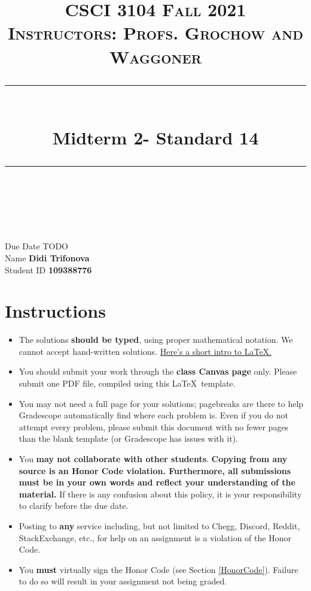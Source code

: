 \documentclass[11pt]{article}
\title{
\normalfont \normalsize 
\textsc{CSCI 3104 Fall 2021 \\ 
Instructors: Profs. Grochow and Waggoner} \\
[10pt] 
\rule{\linewidth}{0.5pt} \\[6pt] 
\huge Midterm 2- Standard 14 \\
\rule{\linewidth}{2pt}  \\[10pt]
}
\date{}
\theoremstyle{definition}
\theoremstyle{definition}
\theoremstyle{definition}
\begin{document}

\maketitle


\noindent
Due Date \dotfill TODO \\
Name \dotfill \textbf{Didi Trifonova} \\
Student ID \dotfill \textbf{109388776} \\


\tableofcontents

\section{Instructions}
 \begin{itemize}
	\item The solutions \textbf{should be typed}, using proper mathematical notation. We cannot accept hand-written solutions. \href{http://ece.uprm.edu/~caceros/latex/introduction.pdf}{Here's a short intro to \LaTeX.}
	\item You should submit your work through the \textbf{class Canvas page} only. Please submit one PDF file, compiled using this \LaTeX \ template.
	\item You may not need a full page for your solutions; pagebreaks are there to help Gradescope automatically find where each problem is. Even if you do not attempt every problem, please submit this document with no fewer pages than the blank template (or Gradescope has issues with it).

	\item You \textbf{may not collaborate with other students}. \textbf{Copying from any source is an Honor Code violation. Furthermore, all submissions must be in your own words and reflect your understanding of the material.} If there is any confusion about this policy, it is your responsibility to clarify before the due date. 

	\item Posting to \textbf{any} service including, but not limited to Chegg, Discord, Reddit, StackExchange, etc., for help on an assignment is a violation of the Honor Code.

	\item You \textbf{must} virtually sign the Honor Code (see Section \ref{HonorCode}). Failure to do so will result in your assignment not being graded.
\end{itemize}
\end{document}
